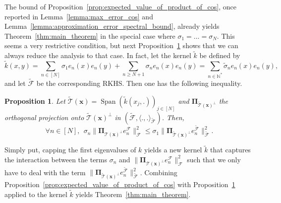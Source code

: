 \documentclass[twoside,11pt]{book}
\newtheorem{proposition}{Proposition}
\DeclareMathOperator{\Span}{\mathrm{Span}}
\begin{document}
The bound of Proposition~\ref{prop:expected_value_of_product_of_cos}, once reported in  Lemma~\ref{lemma:max_error_cos} and Lemma~\ref{lemma:approximation_error_spectral_bound}, already yields Theorem~\ref{thm:main_theorem} in the special case where $\sigma_{1} = \dots = \sigma_{N}$. This seems a very restrictive condition, but next Proposition~\ref{prop:kernel_perturbation_inequality} shows that we can always reduce the analysis to that case.
In fact, let the kernel $\tilde{k}$ be defined by
\begin{equation}\label{eq:tilde_k_kernel_definition}
\tilde{k}(x,y) = \sum\limits_{n \in [N]} \sigma_{1}e_{n}(x)e_{n}(y) + \sum\limits_{n \geq N+1} \sigma_{n}e_{n}(x)e_{n}(y) = \sum\limits_{n \in \mathbb{N}^{*}} \tilde{\sigma}_{n}e_{n}(x)e_{n}(y),
\end{equation}
and let $\tilde{\mathcal{F}}$ be the corresponding RKHS. Then one has the following inequality.
\begin{proposition}\label{prop:kernel_perturbation_inequality}
Let $ \tilde{\mathcal{T}}(\bm{x}) = \Span \left( \tilde{k}(x_{j},.) \right)_{j \in [N]}$ and $\bm{\Pi}_{\tilde{\mathcal{T}}(\bm{x})^{\perp}}$ the orthogonal projection onto $\tilde{\mathcal{T}}(\bm{x})^{\perp}$ in $(\tilde{\mathcal{F}}, \langle .,.\rangle_{\tilde{\mathcal{F}}})$. Then,
\begin{equation}\label{eq:kernel_perturbation_inequality}
	\forall n \in [N], \:\: \sigma_{n} \|\bm{\Pi}_{\mathcal{T}(\bm{x})^{\perp}} e_{n}^{\mathcal{F}}\|_{\mathcal{F}}^{2} \leq \sigma_{1}   \|\bm{\Pi}_{\tilde{\mathcal{T}}(\bm{x})^{\perp}} e_{n}^{\tilde{\mathcal{F}}}\|_{\tilde{\mathcal{F}}}^{2}.
\end{equation}
\end{proposition}
Simply put, capping the first eigenvalues of $k$ yields a new kernel $\tilde{k}$ that captures the interaction between the terms $\sigma_{n}$ and $\|\bm{\Pi}_{\mathcal{T}(\bm{x})^{\perp}} e_{n}^{\mathcal{F}}\|_{\mathcal{F}}^{2}$ such that we only have to deal with the term $\|\bm{\Pi}_{\tilde{\mathcal{T}}(\bm{x})^{\perp}} e_{n}^{\tilde{\mathcal{F}}}\|_{\tilde{\mathcal{F}}}^{2}$.
Combining  Proposition~\ref{prop:expected_value_of_product_of_cos} with Proposition~\ref{prop:kernel_perturbation_inequality} applied to the kernel $\tilde{k}$ yields Theorem~\ref{thm:main_theorem}.
\end{document}
